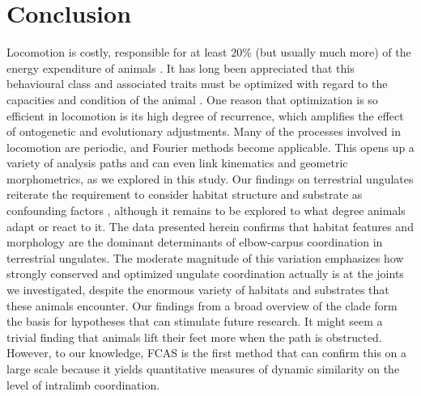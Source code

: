 \section{Conclusion}
Locomotion is costly, responsible for at least $20\%$ (but usually much more) of the energy expenditure of animals \citep{Rezende2009,Girard2001}.
It has long been appreciated that this behavioural class and associated traits must be optimized with regard to the capacities and condition of the animal \citep{Hoyt1981,Reilly2007}.
One reason that optimization is so efficient in locomotion is its high degree of recurrence, which amplifies the effect of ontogenetic and evolutionary adjustments.
Many of the processes involved in locomotion are periodic, and Fourier methods become applicable.
This opens up a variety of analysis paths and can even link kinematics and geometric morphometrics, as we explored in this study.
Our findings on terrestrial ungulates reiterate the requirement to consider habitat structure and substrate as confounding factors \cite[\textit{cf.}][]{Johnson2002,Lejeune1998,Shepard2013}, although it remains to be explored to what degree animals adapt or react to it.
The data presented herein confirms that habitat features and morphology are the dominant determinants of elbow-carpus coordination in terrestrial ungulates.
The moderate magnitude of this variation emphasizes how strongly conserved and optimized ungulate coordination actually is at the joints we investigated, despite the enormous variety of habitats and substrates that these animals encounter.
Our findings from a broad overview of the clade form the basis for hypotheses that can stimulate future research.
It might seem a trivial finding that animals lift their feet more when the path is obstructed.
However, to our knowledge, FCAS is the first method that can confirm this on a large scale because it yields quantitative measures of dynamic similarity on the level of intralimb coordination.


\FloatBarrier\pagebreak
